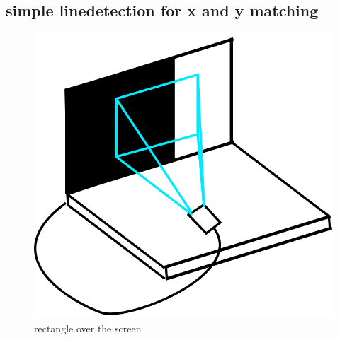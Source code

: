 \documentclass[journal,final,a4paper,twoside]{PS}
\begin{document}
\subsection{simple linedetection for x and y matching}

\begin{figure}[h]
\begin{center}
\includegraphics[scale=0.25]{./pics/rect.png}
\caption{rectangle over the screen}
\label{fig:setup}
\end{center}
\end{figure}
\end{document}
